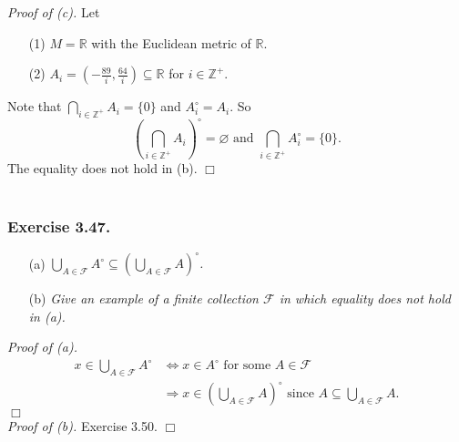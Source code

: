 \documentclass{article}
\begin{document}
\emph{Proof of (c).}
Let
\begin{enumerate}
\item[(1)]
$M = \mathbb{R}$ with the Euclidean metric of $\mathbb{R}$.
\item[(2)]
$A_i = \left( -\frac{89}{i}, \frac{64}{i} \right) \subseteq \mathbb{R}$
for $i \in \mathbb{Z}^+$.
\end{enumerate}
Note that $\bigcap_{i \in \mathbb{Z}^+} A_i = \{ 0 \}$ and $A_i^{\circ} = A_i$.
So $$\left( \bigcap_{i \in \mathbb{Z}^+} A_i \right)^{\circ} = \varnothing
\text{ and } \bigcap_{i \in \mathbb{Z}^+} A_i^{\circ} = \{ 0 \}.$$
The equality does not hold in (b).
$\Box$ \\\\






\subsubsection*{Exercise 3.47.}
\begin{enumerate}
\item[(a)]
\emph{$\bigcup_{A \in \mathscr{F}} A^{\circ}
\subseteq
\left( \bigcup_{A \in \mathscr{F}} A \right)^{\circ}$. }
\item[(b)]
\emph{Give an example of a finite collection $\mathscr{F}$
in which equality does not hold in (a). } \\
\end{enumerate}

\emph{Proof of (a).}
\begin{align*}
x \in \bigcup_{A \in \mathscr{F}} A^{\circ}
&\Longleftrightarrow
x \in A^{\circ} \text{ for some } A \in \mathscr{F} \\
&\Longrightarrow
x \in \left( \bigcup_{A \in \mathscr{F}} A \right)^{\circ}
\text{ since } A \subseteq \bigcup_{A \in \mathscr{F}} A.
\end{align*}
$\Box$ \\

\emph{Proof of (b).}
Exercise 3.50.
$\Box$ \\\\



\end{document}
